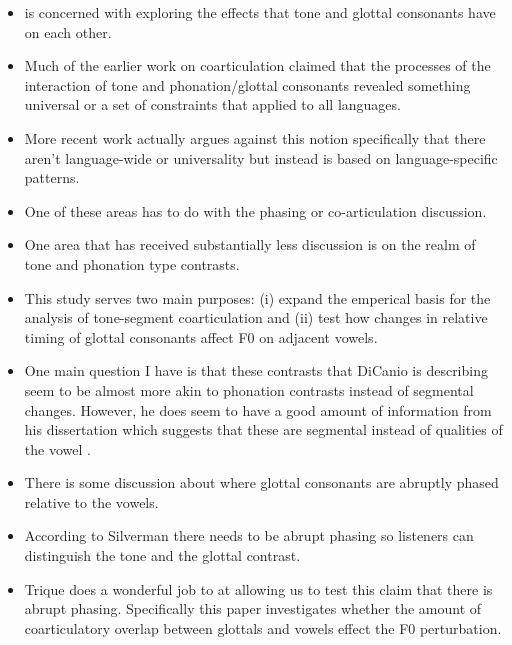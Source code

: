 \documentclass[12pt, letterpaper]{article}
\begin{document}
\begin{itemize}
	\item \citeauthor{dicanioCoarticulationToneGlottal2012} is concerned with exploring the effects that tone and glottal consonants have on each other.
	
	\item Much of the earlier work on coarticulation claimed that the processes of the interaction of tone and phonation/glottal consonants revealed something universal or a set of constraints that applied to all languages.

	\item More recent work actually argues against this notion specifically that there aren’t language-wide or universality but instead is based on language-specific patterns.
	
	\item One of these areas has to do with the phasing or co-articulation discussion.
	
	\item One area that has received substantially less discussion is on the realm of tone and phonation type contrasts.
	
	\item This study serves two main purposes: (i) expand the emperical basis for the analysis of tone-segment coarticulation and (ii) test how changes in relative timing of glottal consonants affect F0 on adjacent vowels.
	
	\item One main question I have is that these contrasts that DiCanio is describing seem to be almost more akin to phonation contrasts instead of segmental changes. However, he does seem to have a good amount of information from his dissertation which suggests that these are segmental instead of qualities of the vowel \citep{dicanioPhoneticsPhonologySan2008}.
	
	\item There is some discussion about \citet{silvermanLaryngealComplexityOtomanguean1997} where glottal consonants are abruptly phased relative to the vowels.
	
	\item According to Silverman there needs to be abrupt phasing so listeners can distinguish the tone and the glottal contrast.
	
	\item Trique does a wonderful job to at allowing us to test this claim that there is abrupt phasing. Specifically this paper investigates whether the amount of coarticulatory overlap between glottals and vowels effect the F0 perturbation.
	

\end{itemize}
\end{document}
